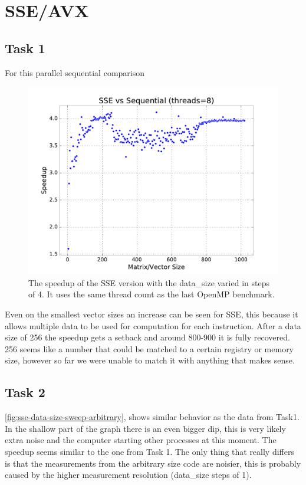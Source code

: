 \documentclass[final]{report}
\begin{document}
\chapter{SSE/AVX}

\section{Task 1}
For this parallel sequential comparison 
\begin{figure}[H]
\centering
    \includegraphics[width=\linewidth]{resources/sse-data-size-sweep.pdf}
    \caption{The speedup of the SSE version with the data\_size varied in steps of 4. It uses the same thread count as the last OpenMP benchmark.}
    \label{fig:sse-data-size-sweep}
\end{figure}

Even on the smallest vector sizes an increase can be seen for SSE, this because it allows multiple data to be used for computation for each instruction.
After a data size of 256 the speedup gets a setback and around 800-900 it is fully recovered.
256 seems like a number that could be matched to a certain registry or memory size, however so far we were unable to match it with anything that makes sense.


\section{Task 2}
\cref{fig:sse-data-size-sweep-arbitrary}, shows similar behavior as the data from Task1.
In the shallow part of the graph there is an even bigger dip, this is very likely extra noise and the computer starting other processes at this moment.
The speedup seems similar to the one from Task 1.
The only thing that really differs is that the measurements from the arbitrary size code are noisier, this is probably caused by the higher measurement resolution (data\_size steps of 1).
\end{document}
